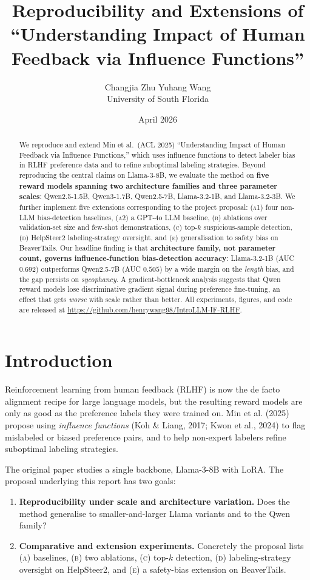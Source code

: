 \documentclass[11pt,a4paper]{article}
\title{\textbf{Reproducibility and Extensions of\\
``Understanding Impact of Human Feedback via Influence Functions''}}
\author{Changjia Zhu \quad Yuhang Wang \\ University of South Florida}
\date{April 2026}
\begin{document}
\maketitle

\begin{abstract}
We reproduce and extend Min et al.\ (ACL 2025) ``Understanding Impact of Human Feedback via Influence Functions,''
which uses influence functions to detect labeler bias in RLHF preference data and to refine
suboptimal labeling strategies. Beyond reproducing the central claims on Llama-3-8B, we
evaluate the method on \textbf{five reward models spanning two architecture families and three parameter
scales}: Qwen2.5-1.5B, Qwen3-1.7B, Qwen2.5-7B, Llama-3.2-1B, and Llama-3.2-3B. We further
implement five extensions corresponding to the project proposal: (\textsc{a1}) four non-LLM bias-detection
baselines, (\textsc{a2}) a GPT-4o LLM baseline, (\textsc{b}) ablations over validation-set size and few-shot
demonstrations, (\textsc{c}) top-$k$ suspicious-sample detection, (\textsc{d}) HelpSteer2 labeling-strategy
oversight, and (\textsc{e}) generalisation to safety bias on BeaverTails.
Our headline finding is that \textbf{architecture family, not parameter count, governs
influence-function bias-detection accuracy}: Llama-3.2-1B (AUC $0.692$) outperforms Qwen2.5-7B
(AUC $0.505$) by a wide margin on the \emph{length} bias, and the gap persists on \emph{sycophancy}.
A gradient-bottleneck analysis suggests that Qwen reward models lose discriminative gradient
signal during preference fine-tuning, an effect that gets \emph{worse} with scale rather than
better. All experiments, figures, and code are released at \url{https://github.com/henrywang98/IntroLLM-IF-RLHF}.
\end{abstract}

\section{Introduction}

Reinforcement learning from human feedback (RLHF) is now the de facto alignment recipe for
large language models, but the resulting reward models are only as good as the preference
labels they were trained on. Min et al. (2025) propose using \emph{influence functions}
(Koh & Liang, 2017; Kwon et al., 2024) to flag mislabeled or biased preference pairs, and to help
non-expert labelers refine suboptimal labeling strategies.

The original paper studies a single backbone, Llama-3-8B with LoRA. The proposal underlying
this report has two goals:
\begin{enumerate}
    \item \textbf{Reproducibility under scale and architecture variation.} Does the method
    generalise to smaller-and-larger Llama variants and to the Qwen family?
    \item \textbf{Comparative and extension experiments.} Concretely the proposal lists
    (\textsc{a}) baselines, (\textsc{b}) two ablations, (\textsc{c}) top-$k$ detection,
    (\textsc{d}) labeling-strategy oversight on HelpSteer2, and (\textsc{e}) a safety-bias
    extension on BeaverTails.
\end{enumerate}
\end{document}

